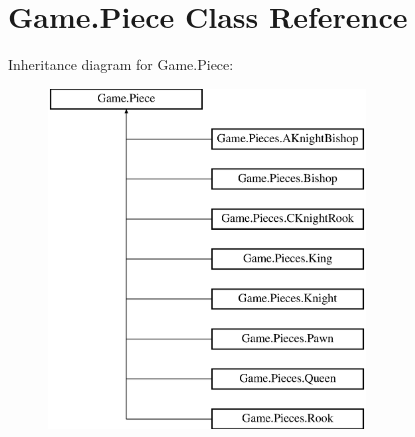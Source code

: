 \hypertarget{class_game_1_1_piece}{}\section{Game.\+Piece Class Reference}
\label{class_game_1_1_piece}
Inheritance diagram for Game.\+Piece\+:\begin{figure}[H]
\begin{center}
\leavevmode
\includegraphics[height=9.000000cm]{class_game_1_1_piece}
\end{center}
\end{figure}
